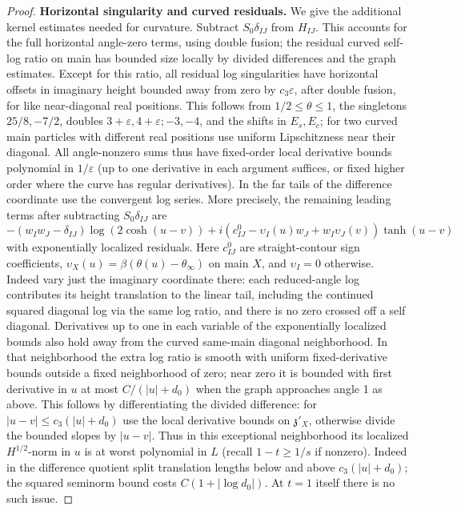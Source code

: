 \begin{proof}
\par\smallskip\noindent\textbf{Horizontal singularity and curved residuals.}
We give the additional kernel estimates needed for curvature. Subtract \(S_0\delta_{IJ}\) from \(H_{IJ}\). This accounts for the full horizontal angle-zero terms, using double fusion; the residual curved self-log ratio on main has bounded size locally by divided differences and the graph estimates. Except for this ratio, all residual log singularities have horizontal offsets in imaginary height bounded away from zero by \(c_3\varepsilon\), after double fusion, for like near-diagonal real positions. This follows from \(1/2\le\theta\le1\), the singletons \(25/8,-7/2\), doubles \(3+\varepsilon,4+\varepsilon;-3,-4\), and the shifts in \(E_s,E_c\); for two curved main particles with different real positions use uniform Lipschitzness near their diagonal. All angle-nonzero sums thus have fixed-order local derivative bounds polynomial in \(1/\varepsilon\) (up to one derivative in each argument suffices, or fixed higher order where the curve has regular derivatives). In the far tails of the difference coordinate use the convergent log series. More precisely, the remaining leading terms after subtracting \(S_0\delta_{IJ}\) are
\[
 -(w_Iw_J-\delta_{IJ})\log(2\cosh(u-v))
 +i(c^0_{IJ}-\upsilon_I(u) w_J+w_I \upsilon_J(v))\tanh(u-v)
\]
with exponentially localized residuals. Here \(c^0_{IJ}\) are straight-contour sign coefficients, \(\upsilon_X(u)=\beta(\theta(u)-\theta_\infty)\) on main \(X\), and \(\upsilon_I=0\) otherwise. Indeed vary just the imaginary coordinate there: each reduced-angle log contributes its height translation to the linear tail, including the continued squared diagonal log via the same log ratio, and there is no zero crossed off a self diagonal. Derivatives up to one in each variable of the exponentially localized bounds also hold away from the curved same-main diagonal neighborhood. In that neighborhood the extra log ratio is smooth with uniform fixed-derivative bounds outside a fixed neighborhood of zero; near zero it is bounded with first derivative in \(u\) at most \(C/(|u|+d_0)\) when the graph approaches angle 1 as above. This follows by differentiating the divided difference: for \(|u-v|\le c_3(|u|+d_0)\) use the local derivative bounds on \(\mathfrak z'_X\), otherwise divide the bounded slopes by \(|u-v|\). Thus in this exceptional neighborhood its localized \(H^{1/2}\)-norm in \(u\) is at worst polynomial in \(L\) (recall \(1-t\ge 1/s\) if nonzero). Indeed in the difference quotient split translation lengths below and above \(c_3(|u|+d_0)\); the squared seminorm bound costs \(C(1+|\log d_0|)\). At \(t=1\) itself there is no such issue.


\end{proof}
